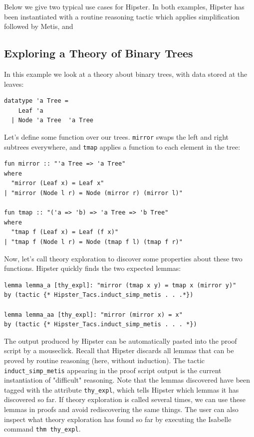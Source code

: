 Below we give two typical use cases for Hipster. In both examples, Hipster has been instantiated with a routine reasoning tactic which applies simplification followed by Metis, and 

\subsection{Exploring a Theory of Binary Trees}
In this example we look at a theory about binary trees, with data stored at the leaves:
\begin{verbatim}
datatype 'a Tree = 
    Leaf 'a 
  | Node 'a Tree  'a Tree
\end{verbatim}
Let's define some function over our trees. \texttt{mirror} swaps the left and right subtrees everywhere, and \texttt{tmap} applies a function to each element in the tree:
\begin{verbatim}
fun mirror :: "'a Tree => 'a Tree"
where
  "mirror (Leaf x) = Leaf x"
| "mirror (Node l r) = Node (mirror r) (mirror l)"

fun tmap :: "('a => 'b) => 'a Tree => 'b Tree"
where
  "tmap f (Leaf x) = Leaf (f x)"
| "tmap f (Node l r) = Node (tmap f l) (tmap f r)" 
\end{verbatim} 
Now, let's call theory exploration to discover some properties about these two functions. Hipster quickly finds the two expected lemmas:  
\begin{verbatim}
lemma lemma_a [thy_expl]: "mirror (tmap x y) = tmap x (mirror y)"
by (tactic {* Hipster_Tacs.induct_simp_metis . . .*})

lemma lemma_aa [thy_expl]: "mirror (mirror x) = x"
by (tactic {* Hipster_Tacs.induct_simp_metis . . . *})
\end{verbatim}
The output produced by Hipster can be automatically pasted into the proof script by a mouseclick. Recall that Hipster discards all lemmas that can be proved by routine reasoning (here, without induction). The tactic \texttt{induct\_simp\_metis} appearing in the proof script output is the current instantiation of "difficult" reasoning. Note that the lemmas discovered have been tagged with the attribute \texttt{thy\_expl}, which tells Hipster which lemmas it has discovered so far. If theory exploration is called several times, we can use these lemmas in proofs and avoid rediscovering the same things. The user can also inspect what theory exploration has found so far by executing the Isabelle command \texttt{thm thy\_expl}.

